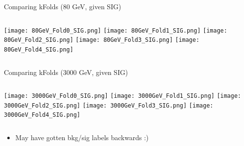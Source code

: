 \documentclass[aspectratio=169,xcolor=table]{beamer}
\begin{document}
    \begin{frame}[t]{Comparing kFolds (80 GeV, given SIG)}
      \centering
      \begin{columns}
        \texttt{[image: 80GeV\_Fold0\_SIG.png]}
        \texttt{[image: 80GeV\_Fold1\_SIG.png]}
        \texttt{[image: 80GeV\_Fold2\_SIG.png]}
        \texttt{[image: 80GeV\_Fold3\_SIG.png]}
        \texttt{[image: 80GeV\_Fold4\_SIG.png]}

      \end{columns}
    \end{frame}

    \begin{frame}[t]{Comparing kFolds (3000 GeV, given SIG)}
      \centering
      \begin{columns}
        \texttt{[image: 3000GeV\_Fold0\_SIG.png]}
        \texttt{[image: 3000GeV\_Fold1\_SIG.png]}
        \texttt{[image: 3000GeV\_Fold2\_SIG.png]}
        \texttt{[image: 3000GeV\_Fold3\_SIG.png]}
        \texttt{[image: 3000GeV\_Fold4\_SIG.png]}
      \end{columns}
      \begin{itemize}
        \item May have gotten bkg/sig labels backwards :)
      \end{itemize}
    \end{frame}
\end{document}

